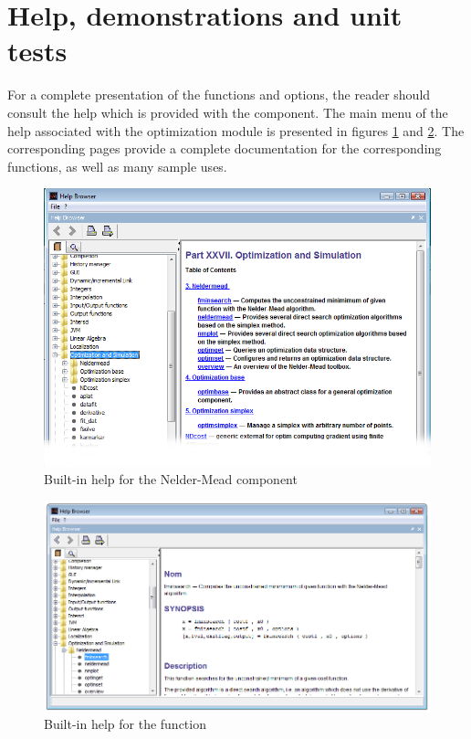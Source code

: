 \section{Help, demonstrations and unit tests}

For a complete presentation of the functions and options, the reader 
should consult the help which is provided with the component.
The main menu of the help associated with the optimization 
module is presented in figures \ref{fig-intro-help} and \ref{fig-intro-helpfminsearch}.
The corresponding pages provide a complete documentation for the 
corresponding functions, as well as many sample uses.

\begin{figure}
\begin{center}
\includegraphics[width=15cm]{introduction/introduction-help.png}
\end{center}
\caption{Built-in help for the Nelder-Mead component}
\label{fig-intro-help}
\end{figure}

\begin{figure}
\begin{center}
\includegraphics[width=15cm]{introduction/introduction-help-fminsearch.png}
\end{center}
\caption{Built-in help for the  function}
\label{fig-intro-helpfminsearch}
\end{figure}


